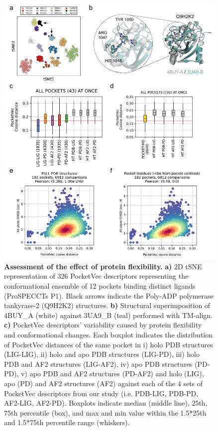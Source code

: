 \begin{figure}[htbp]
  \centering
  \includegraphics[width=\linewidth]{figures/PocketVec/Main/Fig4.png} 
  \caption{
    \textbf{Assessment of the effect of protein flexibility.} 
    \textbf{a)} 2D tSNE representation of 326 PocketVec descriptors representing the conformational ensemble of 12 pockets binding distinct ligands (ProSPECCTs P1). Black arrows indicate the Poly-ADP polymerase tankyrase-2 (Q9H2K2) structures.
    \textbf{b)} Structural superimposition of 4BUY\_A (white) against 3UA9\_B (teal) performed with TM-align\cite{zhang_tm-align_2005}.
    \textbf{c)} PocketVec descriptors’ variability caused by protein flexibility and conformational changes. Each boxplot indicates the distribution of PocketVec distances of the same pocket in i) holo PDB structures (LIG-LIG), ii) holo and apo PDB structures (LIG-PD), iii) holo PDB and AF2 structures (LIG-AF2), iv) apo PDB structures (PD-PD), v) apo PDB and AF2 structures (PD-AF2) and holo (LIG), apo (PD) and AF2 structures (AF2) against each of the 4 sets of PocketVec descriptors from our study (i.e. PDB-LIG, PDB-PD, AF2-LIG, AF2-PD). Boxplots indicate median (middle line), 25th, 75th percentile (box), and max and min value within the 1.5*25th and 1.5*75th percentile range (whiskers).
}
\end{figure}

